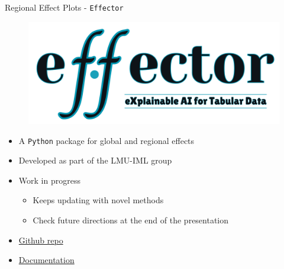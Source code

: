 \documentclass[11pt,compress,t,notes=noshow, aspectratio=169, xcolor=table,dvipsnames]{beamer}
\begin{document}
\begin{frame}{Regional Effect Plots - \texttt{Effector}}
\begin{figure}
    \includegraphics[width=0.5\linewidth]{slides/03_feature-effects/figure/effector_logo.png}
    \label{fig:effector-logo}
\end{figure}
\begin{itemize}
    \item A \texttt{Python} package for global and regional effects
    \item Developed as part of the LMU-IML group
    \item Work in progress
    \begin{itemize}
        \item Keeps updating with novel methods
        \item Check future directions at the end of the presentation
    \end{itemize}
    \item \href{https://github.com/givasile/effector}{Github repo}
    \item \href{https://xai-effector.github.io/}{Documentation}

\end{itemize}
\end{frame}





\end{document}
